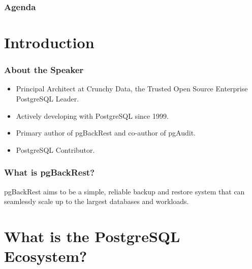 %
\def\mytitle{Evolving towards Postgres}
\def\mysubject{}
\def\myevent{PostgresOpen}
\def\myauthor{David Steele}
\def\myemail{}
\def\mydate{September 13, 2019}

\def\mysuppressnav{}

\def\mytemplatepath{/template/}


\begin{frame}
    \frametitle{Agenda}
    \tableofcontents
\end{frame}

\section{Introduction}

\begin{frame}
    \frametitle{About the Speaker}

    \begin{itemize}
        \item Principal Architect at Crunchy Data, the Trusted Open Source Enterprise PostgreSQL Leader.
        \item Actively developing with PostgreSQL since 1999.
        \item Primary author of pgBackRest and co-author of pgAudit.
        \item PostgreSQL Contributor.
    \end{itemize}
\end{frame}

\begin{frame}
    \frametitle{What is pgBackRest?}

    pgBackRest aims to be a simple, reliable backup and restore system that can seamlessly scale up to the largest databases and workloads.\vspace{1em}
\end{frame}

\section{What is the PostgreSQL Ecosystem?}

